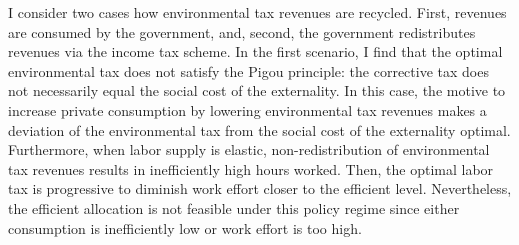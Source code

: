I consider two cases how environmental tax revenues are recycled. First, revenues are consumed by the government, and, second, the government redistributes revenues via the income tax scheme. In the first scenario, I find that the optimal environmental tax does not satisfy the Pigou principle: the corrective tax does not necessarily equal the social cost of the externality. %
In this case, the motive to increase private consumption by lowering environmental tax revenues makes a deviation of the environmental tax from the social cost of the externality optimal.
Furthermore, when labor supply is elastic, non-redistribution of environmental tax revenues results in inefficiently high hours worked. Then, the optimal labor tax is progressive to diminish work effort closer to the efficient level.
Nevertheless, the efficient allocation is not feasible under this policy regime since either consumption is inefficiently low or work effort is too high. 

